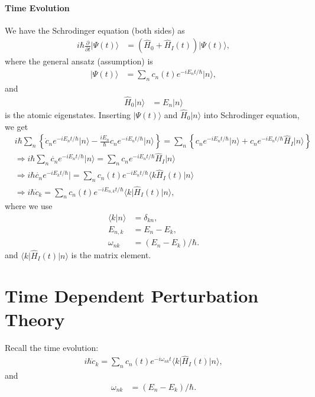 \documentclass[../../note.tex]{subfiles}
\begin{document}
\paragraph{Time Evolution}
We have the Schrodinger equation (both sides) as 
\begin{align}
    i \hbar \frac{\partial}{ \partial t} \vert \Psi(t) \rangle 
    &= (\hat{H}_0 + \hat{H}_I(t))\vert \Psi(t) \rangle,
\end{align}
where the general ansatz (assumption) is 
\begin{align}
    \vert \Psi(t) \rangle
    &= \sum_{n} c_n(t) e^{-i E_n t/\hbar} \vert n \rangle,
\end{align}
and 
\begin{align}
    \hat{H}_0 \vert n \rangle
    &= E_n \vert n \rangle
\end{align}
is the atomic eigenstates. Inserting $\vert \Psi(t) \rangle$ and $\hat{H}_0 \vert n \rangle$ into Schrodinger equation, we get
\begin{align}
    &i \hbar \sum_n \left\{\dot{c}_n e^{-i E_n t/\hbar} \vert n \rangle - \frac{i E_n}{\hbar} c_n e^{-i E_n t/\hbar} \vert n \rangle \right\} 
    = \sum_n \left\{c_n e^{-i E_n t/\hbar} \vert n \rangle + c_n e^{-i E_n t /\hbar} \hat{H}_I \vert n \rangle \right\} \\
    &\Longrightarrow i \hbar \sum_n \dot{c_n}e^{-i E_n t /\hbar} \vert n \rangle = \sum_n c_n e^{-i E_n t /\hbar} \hat{H}_I \vert n \rangle \\
    &\Longrightarrow i \hbar \dot{c_n}e^{-i E_k t /\hbar} \vert= \sum_n c_n(t) e^{-i E_n t/\hbar} \langle k \hat{H}_I(t)\vert n \rangle \\
    &\Longrightarrow i \hbar\dot{c}_k = \sum_n c_n(t) e^{-i E_{n,k} t / \hbar} \langle k \vert \hat{H}_I(t) \vert n \rangle,
\end{align}
where we use
\begin{align}
    \langle k \vert n \rangle 
    &= \delta_{k n}, \\
    E_{n,k}
    &= E_n - E_k, \\
    \omega_{nk}
    &= (E_n - E_k)/\hbar.
\end{align}
and $\langle k \vert \hat{H}_I(t) \vert n \rangle$ is the matrix element.

\section{Time Dependent Perturbation Theory}
Recall the time evolution:
\begin{align}
    i \hbar\dot{c}_k = \sum_n c_n(t) e^{-i \omega_{nk} t} \langle k \vert \hat{H}_I(t) \vert n \rangle,
\end{align}
and
\begin{align}
    \omega_{nk}
    &= (E_n - E_k)/\hbar.
\end{align}
\end{document}

